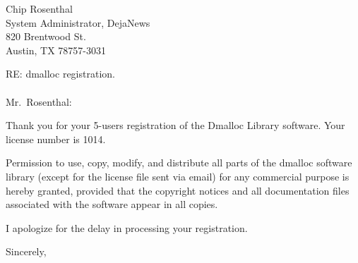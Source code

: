

%
%

%
%
\address{Dmalloc Software \\
330 Harmar St. \\
Pittsburgh, PA  15219-3748 \\
1.412.687.3221}

\signature{Gray Watson \\
gray@letters.com}

\date{January 25, 1995}


\begin{letter}{Chip Rosenthal \\
System Administrator, DejaNews \\
820 Brentwood St. \\
Austin, TX 78757-3031}

\opening{RE: dmalloc registration. \\
 \\
Mr.\ Rosenthal:}

Thank you for your 
5-users registration of the Dmalloc Library software.  Your license
number is
1014.

Permission to use, copy, modify, and distribute all parts of the
dmalloc software library (except for the license file sent via email)
for any commercial purpose is hereby granted, provided that the
copyright notices and all documentation files associated with the
software appear in all copies.

I apologize for the delay in processing your registration.

\closing{Sincerely,}

\end{letter}

